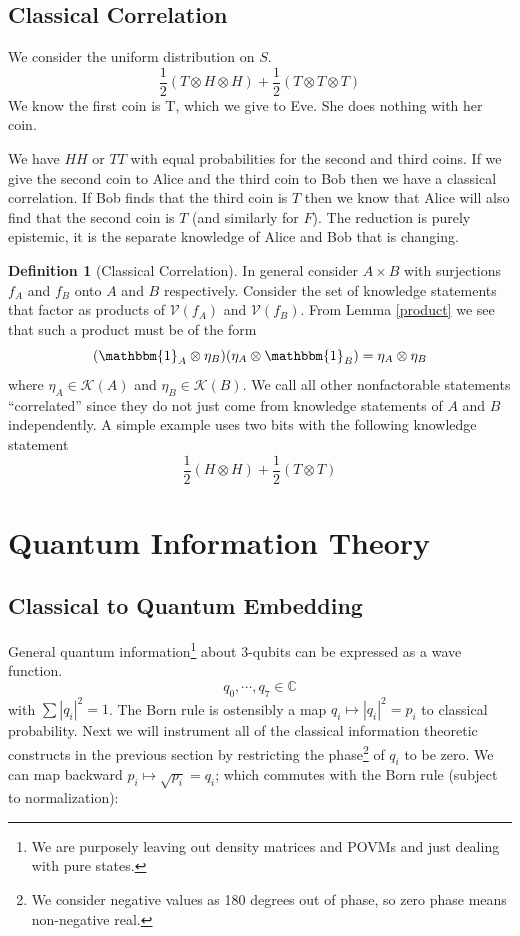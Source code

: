 \documentclass[12pt,a4paper]{article}
\theoremstyle{myrule}
\theoremstyle{postulate}
\theoremstyle{definition}
\newtheorem{definition}{Definition}[section]
\begin{document}
\subsection{Classical Correlation}
We consider the uniform distribution on $S$.
\[
\frac{1}{2}(T \otimes H \otimes H) + \frac{1}{2}(T \otimes T \otimes T)
\]
We know the first coin is T, which we give to Eve.  She does nothing with her coin.

We have $HH$ or $TT$ with equal probabilities for the second and third coins.  If we give the second coin to Alice and the third coin to Bob then we have a classical correlation.  If Bob finds that the third coin is $T$ then we know that Alice will also find that the second coin is $T$ (and similarly for $F$).  The reduction is purely epistemic, it is the separate knowledge of Alice and Bob that is changing.

\begin{definition}[Classical Correlation]
\label{corrdef}
In general consider $A \times B$ with surjections $f_A$ and $f_B$ onto $A$ and $B$ respectively.  Consider the set of knowledge statements that factor as products of $\mathcal{V}(f_A)$ and $\mathcal{V}(f_B)$.  From Lemma \ref{product} we see that such a product must be of the form
\[
(\mathbbm{1}_A \otimes \eta_B) (\eta_A \otimes \mathbbm{1}_B) = \eta_A \otimes \eta_B
\]
where $\eta_A \in \mathcal{K}(A)$ and $\eta_B \in \mathcal{K}(B)$.  We call all other nonfactorable statements ``correlated'' since they do not just come from knowledge statements of $A$ and $B$ independently.  A simple example uses two bits with the following knowledge statement
\[
  \frac{1}{2} (H \otimes H) + \frac{1}{2} (T \otimes T)
\]

\end{definition}

\section{Quantum Information Theory}
\subsection{Classical to Quantum Embedding}
General quantum information\footnote{We are purposely leaving out density matrices and POVMs and just dealing with pure states.} about 3-qubits can be expressed as a wave function.
\[
   q_\mathit{0},\cdots,q_\mathit{7} \in \mathbb{C}
\]
with $\sum |q_i|^2 = 1$.  The Born rule is ostensibly a map $q_i \mapsto |q_i|^2 = p_i$ to classical probability.  Next we will instrument all of the classical information theoretic constructs in the previous section by restricting the phase\footnote{We consider negative values as 180 degrees out of phase, so zero phase means non-negative real.} of $q_i$ to be zero.  We can map backward $p_i \mapsto \sqrt{p_i} = q_i$; which commutes with the Born rule (subject to normalization):
\end{document}
